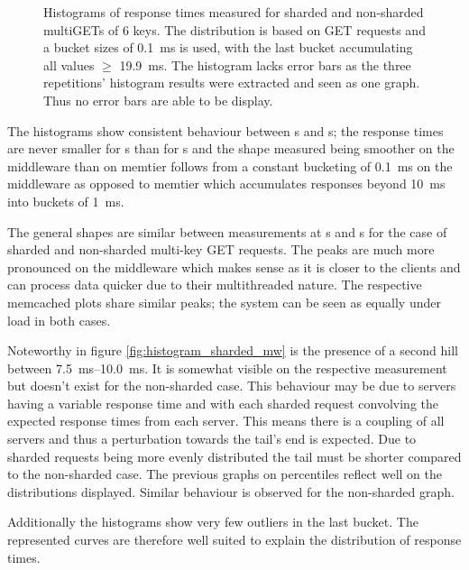 \begin{figure}
\begin{subfigure}[t!]{0.48\textwidth}
            \end{subfigure}
            \caption{Histograms of response times measured for sharded and non-sharded multiGETs of 6 keys. The
                     distribution is based on GET requests and a bucket sizes of \SI{0.1}{\milli\second} is used, with the last
                     bucket accumulating all values $\geq$ \SI{19.9}{\milli\second}. The histogram lacks error bars as
                     the three repetitions' histogram results were extracted and seen as one graph. Thus no error bars
                     are able to be display.\label{fig:histograms}}
        \end{figure}

        The histograms show consistent behaviour between \srv{}s and \mw{}s; the response times are never smaller for
        \srv{}s than for \mw{}s and the shape measured being smoother on the middleware than on memtier follows from
        a constant bucketing of \SI{0.1}{\milli\second} on the middleware as opposed to memtier which accumulates
        responses beyond \SI{10}{\milli\second} into buckets of \SI{1}{\milli\second}.

        The general shapes are similar between measurements at \mw{}s and \cli{}s for the case of sharded and
        non-sharded multi-key GET requests. The peaks are much more pronounced on the middleware which makes sense as it
        is closer to the clients and can process data quicker due to their multithreaded nature. The respective
        memcached plots share similar peaks; the system can be seen as equally under load in both cases.

        Noteworthy in figure \ref{fig:histogram_sharded_mw} is the presence of a second hill between
        \SIrange{7.5}{10.0}{\milli\second}. It is somewhat visible on the respective \cli{} measurement but doesn't
        exist for the non-sharded case. This behaviour may be due to servers having a variable response time and with
        each sharded request convolving the expected response times from each server. This means there is a coupling of
        all servers and thus a perturbation towards the tail's end is expected. Due to sharded requests being more
        evenly distributed the tail must be shorter compared to the non-sharded case. The previous graphs on percentiles
        reflect well on the distributions displayed. Similar behaviour is observed for the non-sharded graph.

        Additionally the histograms show very few outliers in the last bucket. The represented curves are therefore well
        suited to explain the distribution of response times.


